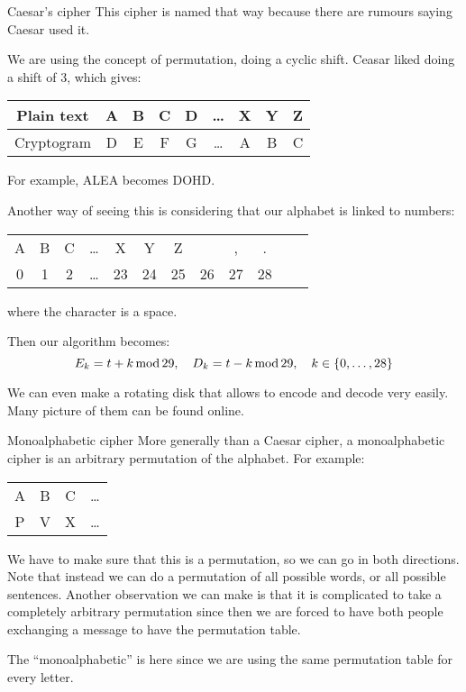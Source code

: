 \documentclass[a4paper]{article}
\begin{document}
\begin{parag}{Caesar's cipher}
    This cipher is named that way because there are rumours saying Caesar used it. 

    We are using the concept of permutation, doing a cyclic shift. Ceasar liked doing a shift of 3, which gives:
    \begin{center}
    \begin{tabular}{c|cccccccc}
        Plain text & A & B & C & D & \ldots & X & Y & Z \\
        \hline
        Cryptogram & D & E & F & G & \ldots & A & B & C \\
    \end{tabular}
    \end{center}
    
    For example, ALEA becomes DOHD.

    Another way of seeing this is considering that our alphabet is linked to numbers: 
    \begin{center}
    \begin{tabular}{cccccccccccc}
        A & B & C & \ldots & X & Y & Z &  & , & . \\
        0 & 1 & 2 & \ldots & 23 & 24 & 25 & 26 & 27 & 28
    \end{tabular}
    \end{center}
    where the  character is a space.
    
    Then our algorithm becomes: 
    \[E_{k} = t + k \Mod 29, \mathspace D_k = t - k \Mod 29, \mathspace k \in \left\{0, \ldots, 28\right\}\]

    We can even make a rotating disk that allows to encode and decode very easily. Many picture of them can be found online.
\end{parag}

\begin{parag}{Monoalphabetic cipher}
    More generally than a Caesar cipher, a monoalphabetic cipher is an arbitrary permutation of the alphabet. For example: 
    \begin{center}
    \begin{tabular}{cccc}
        A & B & C & \ldots \\
        P & V & X & \ldots 
    \end{tabular}
    \end{center}

    We have to make sure that this is a permutation, so we can go in both directions. Note that instead we can do a permutation of all possible words, or all possible sentences. Another observation we can make is that it is complicated to take a completely arbitrary permutation since then we are forced to have both people exchanging a message to have the permutation table.

    The ``monoalphabetic'' is here since we are using the same permutation table for every letter.
\end{parag}
\end{document}
